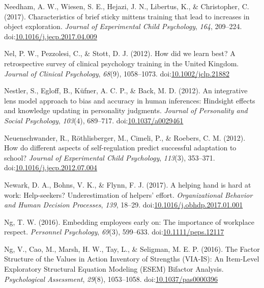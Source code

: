 \documentclass[english,man]{apa6}
\theoremstyle{definition}
\theoremstyle{definition}
\theoremstyle{definition}
\theoremstyle{remark}
\begin{document}
\hypertarget{ref-Needham2017}{}
Needham, A. W., Wiesen, S. E., Hejazi, J. N., Libertus, K., \&
Christopher, C. (2017). Characteristics of brief sticky mittens training
that lead to increases in object exploration. \emph{Journal of
Experimental Child Psychology}, \emph{164}, 209--224.
doi:\href{https://doi.org/10.1016/j.jecp.2017.04.009}{10.1016/j.jecp.2017.04.009}

\hypertarget{ref-Nel2012}{}
Nel, P. W., Pezzolesi, C., \& Stott, D. J. (2012). How did we learn
best? A retrospective survey of clinical psychology training in the
United Kingdom. \emph{Journal of Clinical Psychology}, \emph{68}(9),
1058--1073.
doi:\href{https://doi.org/10.1002/jclp.21882}{10.1002/jclp.21882}

\hypertarget{ref-Nestler}{}
Nestler, S., Egloff, B., Küfner, A. C. P., \& Back, M. D. (2012). An
integrative lens model approach to bias and accuracy in human
inferences: Hindsight effects and knowledge updating in personality
judgments. \emph{Journal of Personality and Social Psychology},
\emph{103}(4), 689--717.
doi:\href{https://doi.org/10.1037/a0029461}{10.1037/a0029461}

\hypertarget{ref-Neuenschwander2012}{}
Neuenschwander, R., Röthlisberger, M., Cimeli, P., \& Roebers, C. M.
(2012). How do different aspects of self-regulation predict successful
adaptation to school? \emph{Journal of Experimental Child Psychology},
\emph{113}(3), 353--371.
doi:\href{https://doi.org/10.1016/j.jecp.2012.07.004}{10.1016/j.jecp.2012.07.004}

\hypertarget{ref-Newark2017}{}
Newark, D. A., Bohns, V. K., \& Flynn, F. J. (2017). A helping hand is
hard at work: Help-seekers? Underestimation of helpers' effort.
\emph{Organizational Behavior and Human Decision Processes}, \emph{139},
18--29.
doi:\href{https://doi.org/10.1016/j.obhdp.2017.01.001}{10.1016/j.obhdp.2017.01.001}

\hypertarget{ref-Ng2016}{}
Ng, T. W. (2016). Embedding employees early on: The importance of
workplace respect. \emph{Personnel Psychology}, \emph{69}(3), 599--633.
doi:\href{https://doi.org/10.1111/peps.12117}{10.1111/peps.12117}

\hypertarget{ref-Ng2017}{}
Ng, V., Cao, M., Marsh, H. W., Tay, L., \& Seligman, M. E. P. (2016).
The Factor Structure of the Values in Action Inventory of Strengths
(VIA-IS): An Item-Level Exploratory Structural Equation Modeling (ESEM)
Bifactor Analysis. \emph{Psychological Assessment}, \emph{29}(8),
1053--1058.
doi:\href{https://doi.org/10.1037/pas0000396}{10.1037/pas0000396}
\end{document}
